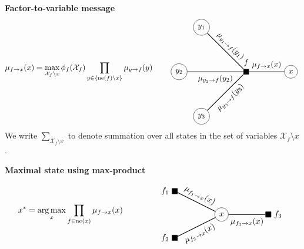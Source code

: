 \documentclass{article}
\DeclareMathOperator*{\argmax}{arg\,max}
\begin{document}
\begin{theorem}
    \textbf{Factor-to-variable message} 
    \begin{equation*}
        \begin{aligned}
            \mu_{f \rightarrow x}(x) = \max_{\mathcal{X}_f\text{\textbackslash} x} \phi_f(\mathcal{X}_f) \prod_{y \in \{\text{ne}(f)\text{\textbackslash}x\}} \mu_{y \rightarrow f}(y)
        \end{aligned}
        \qquad
        \vcenter{\hbox{
        \begin{tikzpicture}
            \node[rectangle, draw, fill=black, label=above:{$f$}] at (0, 0)   (f) {};
            \node[circle, draw] at (-2, 2)   (y1) {$y_1$};
            \node[circle, draw] at (-3, 0)   (y2) {$y_2$};
            \node[circle, draw] at (-2, -2)  (y3) {$y_3$};

            \node[circle, draw] at (2, 0)   (x) {$x$};
            
            \draw [thick] (y1) -- (f) node [midway,sloped, above, draw=none] {$\mu_{y_1 \rightarrow f}(y_1)$};
            \draw [thick] (y2) -- (f) node [midway,sloped, below, draw=none] {$\mu_{y_2 \rightarrow f}(y_2)$};
            \draw [thick] (y3) -- (f) node [midway,sloped, below, draw=none] {$\mu_{y_3 \rightarrow f}(y_3)$};
            \draw [thick] (f) -- (x) node [midway,sloped, above, draw=none] {$\mu_{f \rightarrow x}(x)$};
        \end{tikzpicture}
        }}
    \end{equation*}
    We write $\sum_{\mathcal{X}_f\text{\textbackslash} x}$ to denote summation over all states in the set of variables $\mathcal{X}_f\text{\textbackslash} x$.
\end{theorem}

\begin{theorem}
    \textbf{Maximal state using max-product} 
    \begin{equation*}
        \begin{aligned}
            x^* = \argmax_x \prod_{f \in \text{ne}(x)} \mu_{f \rightarrow x}(x)
        \end{aligned}
        \qquad\qquad
        \vcenter{\hbox{
        \begin{tikzpicture}
            \node[circle, draw] at (0, 0)   (x) {$x$};
            \node[rectangle, draw, fill=black, label=left:{$f_1$}] at (-2, 1)   (f1) {};
            \node[rectangle, draw, fill=black, label=left:{$f_2$}] at (-2, -1)   (f2) {};
            \node[rectangle, draw, fill=black, label=right:{$f_3$}] at (2, 0)   (f3) {};
            
            \draw [thick] (f1) -- (x) node [midway,sloped, above, draw=none] {$\mu_{f_1 \rightarrow x}(x)$};
            \draw [thick] (f2) -- (x) node [midway,sloped, below, draw=none] {$\mu_{f_2 \rightarrow x}(x)$};
            \draw [thick] (f3) -- (x) node [midway,sloped, below, draw=none] {$\mu_{f_3 \rightarrow x}(x)$};
        \end{tikzpicture}
        }}
    \end{equation*}
\end{theorem}
\end{document}
